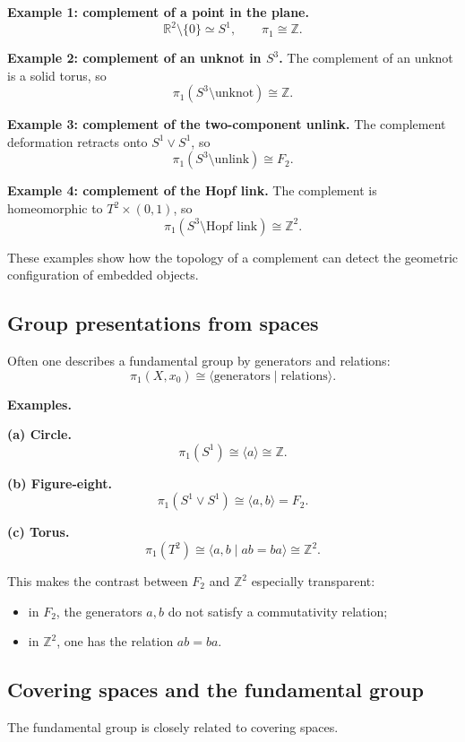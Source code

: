 \documentclass[12pt,a4paper]{article}
\theoremstyle{notespace}
\begin{document}
\textbf{Example 1: complement of a point in the plane.}
\[
\mathbb R^2\setminus\{0\}\simeq S^1,
\qquad
\pi_1\cong \mathbb Z.
\]

\textbf{Example 2: complement of an unknot in \(S^3\).}
The complement of an unknot is a solid torus, so
\[
\pi_1(S^3\setminus \text{unknot})\cong \mathbb Z.
\]

\textbf{Example 3: complement of the two-component unlink.}
The complement deformation retracts onto \(S^1\vee S^1\), so
\[
\pi_1(S^3\setminus \text{unlink})\cong F_2.
\]

\textbf{Example 4: complement of the Hopf link.}
The complement is homeomorphic to \(T^2\times (0,1)\), so
\[
\pi_1(S^3\setminus \text{Hopf link})\cong \mathbb Z^2.
\]

These examples show how the topology of a complement can detect the geometric configuration of embedded objects.

\subsection{Group presentations from spaces}

Often one describes a fundamental group by generators and relations:
\[
\pi_1(X,x_0)\cong \langle \text{generators} \mid \text{relations} \rangle.
\]

\textbf{Examples.}

\textbf{(a) Circle.}
\[
\pi_1(S^1)\cong \langle a \rangle \cong \mathbb Z.
\]

\textbf{(b) Figure-eight.}
\[
\pi_1(S^1\vee S^1)\cong \langle a,b\rangle = F_2.
\]

\textbf{(c) Torus.}
\[
\pi_1(T^2)\cong \langle a,b \mid ab=ba\rangle \cong \mathbb Z^2.
\]

This makes the contrast between \(F_2\) and \(\mathbb Z^2\) especially transparent:
\begin{itemize}
	\item in \(F_2\), the generators \(a,b\) do not satisfy a commutativity relation;
	\item in \(\mathbb Z^2\), one has the relation \(ab=ba\).
\end{itemize}

\subsection{Covering spaces and the fundamental group}

The fundamental group is closely related to covering spaces.
\end{document}
